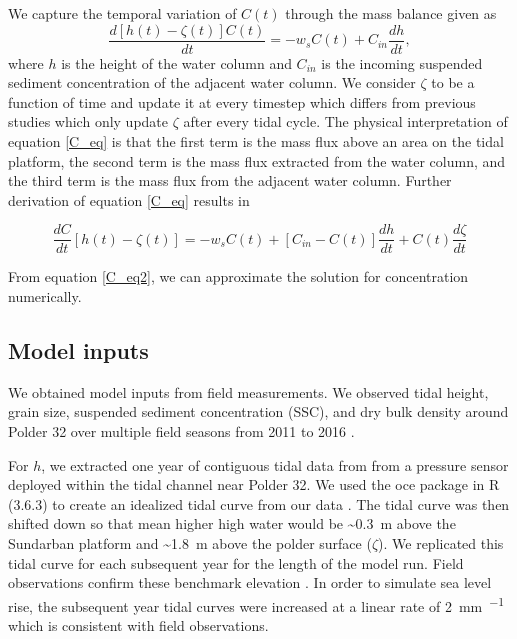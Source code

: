 \documentclass[9pt,twocolumn,twoside,lineno]{pnas-new}
\begin{document}
We capture the temporal variation of $C(t)$ through the mass balance given as
\begin{equation}\label{C_eq}
	\frac{d[h(t)-\zeta(t)]C(t)}{dt} = -w_sC(t)+C_{in}\frac{dh}{dt},
\end{equation}
where $h$ is the height of the water column and $C_{in}$ is the incoming suspended sediment concentration of the adjacent water column. We consider $\zeta$ to be a function of time and update it at every timestep which differs from previous studies \cite{kroneMethodSimulatingMarsh1987,allenSaltmarshGrowthStratification1990,frenchNumericalSimulationVertical1993,temmermanModellingLongtermTidal2003,temmermanModellingEstuarineVariations2004,frenchTidalMarshSedimentation2006} which only update $\zeta$ after every tidal cycle. The physical interpretation of equation \ref{C_eq} is that the first term is the mass flux above an area on the tidal platform, the second term is the mass flux extracted from the water column, and the third term is the mass flux from the adjacent water column. Further derivation of equation \ref{C_eq} results in

\begin{equation}\label{C_eq2}
	\frac{dC}{dt}[h(t) - \zeta(t)] = -w_sC(t) + [C_{in} - C(t)]\frac{dh}{dt} + C(t)\frac{d\zeta}{dt}
\end{equation}

From equation \ref{C_eq2}, we can approximate the solution for concentration numerically.


\subsection*{Model inputs}

We obtained model inputs from field measurements. We observed tidal height, grain size, suspended sediment concentration (SSC), and dry bulk density around Polder 32 over multiple field seasons from 2011 to 2016 \cite{auerbachFloodRiskNatural2015,haleObservationsScalingTidal2019,haleSeasonalVariabilityForces2019}.

For $h$, we extracted one year of contiguous tidal data from from a pressure sensor deployed within the tidal channel near Polder 32. We used the oce package in R (3.6.3) to create an idealized tidal curve from our data \cite{kelleyOceAnalysisOceanographic2020}. The tidal curve was then shifted down so that mean higher high water would be \SI{~0.3}{\meter} above the Sundarban platform and \SI{~1.8}{\meter} above the polder surface ($\zeta$). We replicated this tidal curve for each subsequent year for the length of the model run. Field observations confirm these benchmark elevation \cite{auerbachFloodRiskNatural2015,haleSeasonalVariabilityForces2019,bomerSurfaceElevationSedimentation2020}. In order to simulate sea level rise, the subsequent year tidal curves were increased at a linear rate of \SI{2}{\milli\meter\per\year} which is consistent with field observations.
\end{document}
